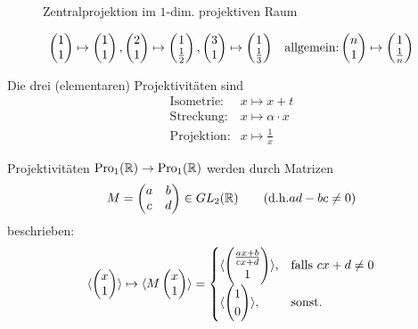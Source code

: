   \begin{figure}[ht]
    
    \caption{Zentralprojektion im $1$-dim. projektiven Raum}
  \end{figure}

  \begin{align*}
    \begin{pmatrix}{1}\\{1}\end{pmatrix} \mapsto \begin{pmatrix}{1}\\{1}\end{pmatrix}, & \begin{pmatrix}{2}\\{1}\end{pmatrix} \mapsto \begin{pmatrix}{1}\\{\frac{1}{2}}\end{pmatrix}, \begin{pmatrix}{3}\\{1}\end{pmatrix} \mapsto \begin{pmatrix}{1}\\{\frac{1}{3}}\end{pmatrix} &
    \text{allgemein:} \begin{pmatrix}{n}\\{1}\end{pmatrix} \mapsto \begin{pmatrix}{1}\\{\frac{1}{n}}\end{pmatrix}
  \end{align*}

  Die drei (elementaren) Projektivitäten sind
  \begin{equation*}
    \begin{array}{rl}
      \text{Isometrie:}  & x \mapsto x+t \\
      \text{Streckung:}  & x \mapsto \alpha \cdot x \\
      \text{Projektion:} & x \mapsto \frac{1}{x}
    \end{array}
  \end{equation*}

  \begin{bem}
    Projektivitäten $\operatorname{Pro}_1(\mathbb R) \to \operatorname{Pro}_1(\mathbb R)$ werden durch Matrizen
    \begin{align*}
      M = \begin{pmatrix} a & b \\ c & d \end{pmatrix} \in GL_2(\mathbb R) \qquad (\mbox{d.h.} ad-bc \neq 0 )
    \end{align*}
    beschrieben:
    \begin{align*}
      \langle \begin{pmatrix}{x}\\{1}\end{pmatrix} \rangle \mapsto \langle M \begin{pmatrix}{x}\\{1}\end{pmatrix} \rangle
          = \begin{cases} \langle \begin{pmatrix}{\frac{ax+b}{cx+d}}\\{1}\end{pmatrix} \rangle, & \mbox{falls $cx+d \neq 0$} \\
                          \langle \begin{pmatrix}{1}\\{0}\end{pmatrix} \rangle,                 & \mbox{sonst.}
            \end{cases}
    \end{align*}
  \end{bem}

